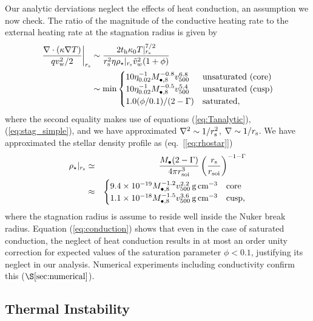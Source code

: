 \documentclass[usenatbib,fleqn]{mn2e}
\begin{document}
Our analytic derviations neglect the effects of heat conduction, an assumption we now check.  The ratio of the magnitude of the conductive heating rate to the external heating rate at the stagnation radius is given by
\begin{align}
  \left.\frac{\nabla\cdot(\kappa \nabla T)}{q v_{\rm
w}^{2}/2}\right|_{r_{\rm s}} &\sim \frac{2t_{\rm h}\kappa_0
T|_{r_{\rm s}}^{7/2}}{r_{\rm s}^{2}\eta \rho_{\star}|_{r_{\rm s}} \tilde{v}_{w}^{2}(1+\phi)}
\nonumber \\ &\sim {\rm min}
  \begin{cases}
  10 \eta_{0.02}^{-1}
M_{\bullet,8}^{-0.8} v_{500}^{6.8} &  \text{unsaturated (core)}\\
 10 \eta_{0.02}^{-1}
M_{\bullet,8}^{-0.5} v_{500}^{5.4} &  \text{unsaturated (cusp)}\\
  1.0(\phi/0.1)/(2-\Gamma) & \text{saturated},
  \end{cases}
 \label{eq:conduction}
\end{align}
where the second equality makes use of equations (\ref{eq:Tanalytic}), (\ref{eq:stag_simple}), and we have approximated $\nabla^{2} \sim 1/r_{\rm s}^{2}$, $\nabla \sim 1/r_{\rm s}$.  We have approximated the stellar density profile as (eq.~[\ref{eq:rhostar}])
\begin{eqnarray}
  \rho_{\star}|_{r_{\rm s}} &\simeq& \frac{M_{\bullet}(2-\Gamma)}{4\pi r_{\rm soi}^{3}}\left(\frac{r_{\rm s}}{r_{\rm soi}}\right)^{-1-\Gamma} \nonumber \\
 &\approx& \begin{cases}
    9.4 \times 10^{-19}M_{\bullet,8}^{-1.2}v_{500}^{2.2}\,{\rm g\,cm^{-3}}
    & \text{core} \\
    1.1 \times 10^{-18} M_{\bullet,8}^{-1.5}v_{500}^{3.6}
    \,{\rm g\,cm^{-3}}  & \text{cusp}, 
  \end{cases}
  \label{eq:rhostarrs}
\end{eqnarray}
where the stagnation radius is assume to reside well inside the Nuker break radius.  Equation (\ref{eq:conduction}) shows that even in the case of saturated conduction, the neglect of heat conduction results in at most an order unity correction for expected values of the saturation parameter $\phi < 0.1$, justifying its neglect in our analysis.  Numerical experiments including conductivity confirm this ($\S\ref{sec:numerical}$). 

\subsection{Thermal Instability}
\label{sec:instability}
\end{document}
